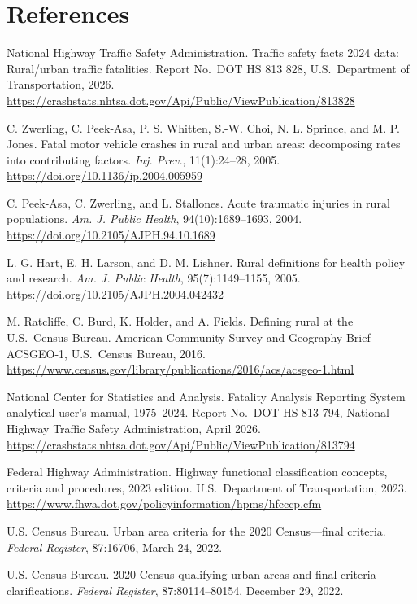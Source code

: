 \documentclass[12pt]{article}
\begin{document}
\section*{References}
{\small \noindent [1] National Highway Traffic Safety Administration. Traffic safety facts 2024 data: Rural/urban traffic fatalities. Report No.\ DOT HS 813 828, U.S.\ Department of Transportation, 2026. \url{https://crashstats.nhtsa.dot.gov/Api/Public/ViewPublication/813828}

\noindent [2] C. Zwerling, C. Peek-Asa, P. S. Whitten, S.-W. Choi, N. L. Sprince, and M. P. Jones. Fatal motor vehicle crashes in rural and urban areas: decomposing rates into contributing factors. \textit{Inj. Prev.}, 11(1):24--28, 2005. \url{https://doi.org/10.1136/ip.2004.005959}

\noindent [3] C. Peek-Asa, C. Zwerling, and L. Stallones. Acute traumatic injuries in rural populations. \textit{Am. J. Public Health}, 94(10):1689--1693, 2004. \url{https://doi.org/10.2105/AJPH.94.10.1689}

\noindent [4] L. G. Hart, E. H. Larson, and D. M. Lishner. Rural definitions for health policy and research. \textit{Am. J. Public Health}, 95(7):1149--1155, 2005. \url{https://doi.org/10.2105/AJPH.2004.042432}

\noindent [5] M. Ratcliffe, C. Burd, K. Holder, and A. Fields. Defining rural at the U.S.\ Census Bureau. American Community Survey and Geography Brief ACSGEO-1, U.S.\ Census Bureau, 2016. \url{https://www.census.gov/library/publications/2016/acs/acsgeo-1.html}

\noindent [6] National Center for Statistics and Analysis. Fatality Analysis Reporting System analytical user's manual, 1975--2024. Report No.\ DOT HS 813 794, National Highway Traffic Safety Administration, April 2026. \url{https://crashstats.nhtsa.dot.gov/Api/Public/ViewPublication/813794}

\noindent [7] Federal Highway Administration. Highway functional classification concepts, criteria and procedures, 2023 edition. U.S.\ Department of Transportation, 2023. \url{https://www.fhwa.dot.gov/policyinformation/hpms/hfcccp.cfm}

\noindent [8] U.S. Census Bureau. Urban area criteria for the 2020 Census---final criteria. \textit{Federal Register}, 87:16706, March 24, 2022.

\noindent [9] U.S. Census Bureau. 2020 Census qualifying urban areas and final criteria clarifications. \textit{Federal Register}, 87:80114--80154, December 29, 2022.

}
\end{document}
